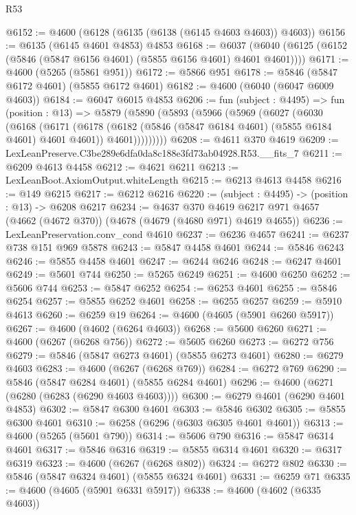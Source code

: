 \begin{lexlean}{R53}
\begin{coremodule}
@6152 := @4600 (@6128 (@6135 (@6138 (@6145 @4603 @4603)) @4603))
@6156 := @6135 (@6145 @4601 @4853) @4853
@6168 := @6037 (@6040 (@6125 (@6152 (@5846 (@5847 @6156 @4601) (@5855 @6156 @4601) @4601 @4601))))
@6171 := @4600 (@5265 (@5861 @951))
@6172 := @5866 @951
@6178 := @5846 (@5847 @6172 @4601) (@5855 @6172 @4601)
@6182 := @4600 (@6040 (@6047 @6009 @4603))
@6184 := @6047 @6015 @4853
@6206 := fun (subject : @4495) =>
  fun (position : @13) =>
  @5879
    (@5890
      (@5893
        (@5966
          (@5969
            (@6027
              (@6030
                (@6168
                  (@6171
                    (@6178
                      (@6182 (@5846 (@5847 @6184 @4601) (@5855 @6184 @4601) @4601 @4601))
                      @4601)))))))))
@6208 := @4611 @370 @4619
@6209 := LexLeanPreserve.C3be289e6dfa0da8c188e3fd73ab04928.R53.__fits_7
@6211 := @6209 @4613 @4458
@6212 := @4621 @6211
@6213 := LexLeanBoot.AxiomOutput.whiteLength
@6215 := @6213 @4613 @4458
@6216 := @149 @6215
@6217 := @6212 @6216
@6220 := (subject : @4495) -> (position : @13) -> @6208 @6217
@6234 := @4637
    @370
    @4619
    @6217
    @971
    @4657
    (@4662 (@4672 @370))
    (@4678 (@4679 (@4680 @971) @4619 @4655))
@6236 := LexLeanPreservation.conv_cond @4610
@6237 := @6236 @4657
@6241 := @6237 @738 @151 @969 @5878
@6243 := @5847 @4458 @4601
@6244 := @5846 @6243
@6246 := @5855 @4458 @4601
@6247 := @6244 @6246
@6248 := @6247 @4601
@6249 := @5601 @744
@6250 := @5265 @6249
@6251 := @4600 @6250
@6252 := @5606 @744
@6253 := @5847 @6252
@6254 := @6253 @4601
@6255 := @5846 @6254
@6257 := @5855 @6252 @4601
@6258 := @6255 @6257
@6259 := @5910 @4613
@6260 := @6259 @19
@6264 := @4600 (@4605 (@5901 @6260 @5917))
@6267 := @4600 (@4602 (@6264 @4603))
@6268 := @5600 @6260
@6271 := @4600 (@6267 (@6268 @756))
@6272 := @5605 @6260
@6273 := @6272 @756
@6279 := @5846 (@5847 @6273 @4601) (@5855 @6273 @4601)
@6280 := @6279 @4603
@6283 := @4600 (@6267 (@6268 @769))
@6284 := @6272 @769
@6290 := @5846 (@5847 @6284 @4601) (@5855 @6284 @4601)
@6296 := @4600 (@6271 (@6280 (@6283 (@6290 @4603 @4603))))
@6300 := @6279 @4601 (@6290 @4601 @4853)
@6302 := @5847 @6300 @4601
@6303 := @5846 @6302
@6305 := @5855 @6300 @4601
@6310 := @6258 (@6296 (@6303 @6305 @4601 @4601))
@6313 := @4600 (@5265 (@5601 @790))
@6314 := @5606 @790
@6316 := @5847 @6314 @4601
@6317 := @5846 @6316
@6319 := @5855 @6314 @4601
@6320 := @6317 @6319
@6323 := @4600 (@6267 (@6268 @802))
@6324 := @6272 @802
@6330 := @5846 (@5847 @6324 @4601) (@5855 @6324 @4601)
@6331 := @6259 @71
@6335 := @4600 (@4605 (@5901 @6331 @5917))
@6338 := @4600 (@4602 (@6335 @4603))

\end{coremodule}
\end{lexlean}
